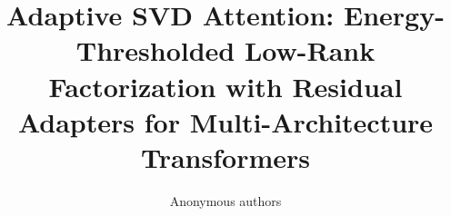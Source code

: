 \title{Adaptive SVD Attention: Energy-Thresholded Low-Rank Factorization with Residual Adapters for Multi-Architecture Transformers}

\author{Anonymous authors}

